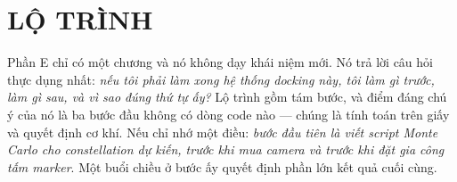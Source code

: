 \documentclass[../marker.tex]{subfiles}
\begin{document}
\part{LỘ TRÌNH}
\begin{tomtat}
Phần E chỉ có một chương và nó không dạy khái niệm mới. Nó trả lời câu hỏi thực dụng nhất: \emph{nếu tôi phải làm xong hệ thống docking này, tôi làm gì trước, làm gì sau, và vì sao đúng thứ tự ấy?} Lộ trình gồm tám bước, và điểm đáng chú ý của nó là ba bước đầu không có dòng code nào --- chúng là tính toán trên giấy và quyết định cơ khí. Nếu chỉ nhớ một điều: \emph{bước đầu tiên là viết script Monte Carlo cho constellation dự kiến, trước khi mua camera và trước khi đặt gia công tấm marker}. Một buổi chiều ở bước ấy quyết định phần lớn kết quả cuối cùng.
\end{tomtat}


\ifSubfilesClassLoaded{\printbibliography[title={Nguồn}]}{}
\end{document}
